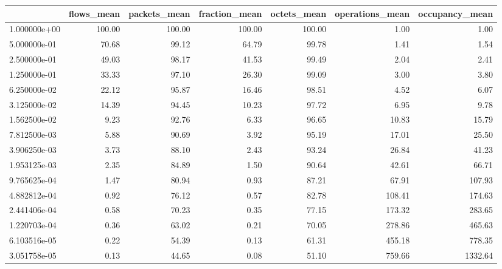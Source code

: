 \begin{tabular}{lrrrrrr}
\toprule
{} &  flows\_mean &  packets\_mean &  fraction\_mean &  octets\_mean &  operations\_mean &  occupancy\_mean \\
\midrule
1.000000e+00 &      100.00 &        100.00 &         100.00 &       100.00 &             1.00 &            1.00 \\
5.000000e-01 &       70.68 &         99.12 &          64.79 &        99.78 &             1.41 &            1.54 \\
2.500000e-01 &       49.03 &         98.17 &          41.53 &        99.49 &             2.04 &            2.41 \\
1.250000e-01 &       33.33 &         97.10 &          26.30 &        99.09 &             3.00 &            3.80 \\
6.250000e-02 &       22.12 &         95.87 &          16.46 &        98.51 &             4.52 &            6.07 \\
3.125000e-02 &       14.39 &         94.45 &          10.23 &        97.72 &             6.95 &            9.78 \\
1.562500e-02 &        9.23 &         92.76 &           6.33 &        96.65 &            10.83 &           15.79 \\
7.812500e-03 &        5.88 &         90.69 &           3.92 &        95.19 &            17.01 &           25.50 \\
3.906250e-03 &        3.73 &         88.10 &           2.43 &        93.24 &            26.84 &           41.23 \\
1.953125e-03 &        2.35 &         84.89 &           1.50 &        90.64 &            42.61 &           66.71 \\
9.765625e-04 &        1.47 &         80.94 &           0.93 &        87.21 &            67.91 &          107.93 \\
4.882812e-04 &        0.92 &         76.12 &           0.57 &        82.78 &           108.41 &          174.63 \\
2.441406e-04 &        0.58 &         70.23 &           0.35 &        77.15 &           173.32 &          283.65 \\
1.220703e-04 &        0.36 &         63.02 &           0.21 &        70.05 &           278.86 &          465.63 \\
6.103516e-05 &        0.22 &         54.39 &           0.13 &        61.31 &           455.18 &          778.35 \\
3.051758e-05 &        0.13 &         44.65 &           0.08 &        51.10 &           759.66 &         1332.64 \\

\end{tabular}

